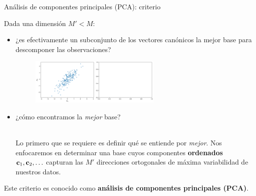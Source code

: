 \documentclass[9pt, handout]{beamer}
\begin{document}
\begin{frame}{Análisis de componentes principales (PCA): criterio}
	
	Dada una dimensión $M'<M$:    	
	\begin{itemize}
		\item ¿es efectivamente un subconjunto de los vectores canónicos la mejor base para descomponer las observaciones? \pause
		\begin{figure}[H]
	\centering
	\includegraphics[width=0.6\textwidth]{../img/cap6_pca.pdf}
	\end{figure}\pause

		\item ¿cómo encontramos la \emph{mejor} base?\\~\ \pause
		
		Lo primero que se requiere es definir qué se entiende por \emph{mejor}. Nos enfocaremos en determinar una base cuyos componentes \textbf{ordenados} $\mathbf{c}_1,\mathbf{c}_2,\ldots$ capturan las $M'$ direcciones ortogonales de máxima variabilidad de nuestros datos.
	\end{itemize}
	Este criterio es conocido como \textbf{análisis de componentes principales (PCA)}.
\end{frame}
\end{document}
